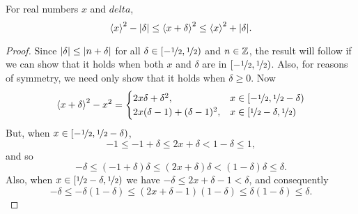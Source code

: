 \documentclass[journal]{IEEEtran}
\begin{document}
\begin{lemma}\label{lem:boundedsquarefracparts} For real numbers $x$ and $delta$,
\[
\left\langle x \right\rangle^2 - |\delta| \leq \left\langle x + \delta \right\rangle^2 \leq \left\langle x \right\rangle^2 + |\delta|.
\]
\end{lemma}
\begin{proof}
Since $\left\vert \delta \right\vert \leq \left\vert n + \delta \right\vert$ for all $\delta \in [-\nicefrac{1}{2}, \nicefrac{1}{2})$ and $n \in {\mathbb Z}$, the result will follow if we can show that it holds when both $x$ and $\delta$ are in $[-\nicefrac{1}{2}, \nicefrac{1}{2})$.  Also, for reasons of symmetry, we need only show that it holds when $\delta \geq 0$.  Now
\[
\left\langle x + \delta \right\rangle^2 - x^2 = \begin{cases}
2x\delta + \delta^2, & x \in [-\nicefrac{1}{2}, \nicefrac{1}{2} - \delta) \\
2x(\delta-1) + (\delta-1)^2, & x \in [\nicefrac{1}{2} - \delta, \nicefrac{1}{2})
\end{cases}
\] 
But, when $x \in [-\nicefrac{1}{2}, \nicefrac{1}{2} - \delta)$, 
\[
-1 \leq -1 + \delta \leq 2x + \delta < 1 - \delta \leq 1,
\]
and so
\[
-\delta \leq (-1 + \delta)\delta \leq (2x + \delta)\delta < (1-\delta)\delta \leq \delta.
\]
Also, when $x \in [\nicefrac{1}{2} - \delta, \nicefrac{1}{2})$ we  have $-\delta \leq 2x + \delta - 1 < \delta$, and consequently
\[
-\delta \leq -\delta(1-\delta) \leq (2x + \delta - 1)(1 - \delta) \leq \delta(1 - \delta) \leq \delta.
\]


\end{proof}
\end{document}
